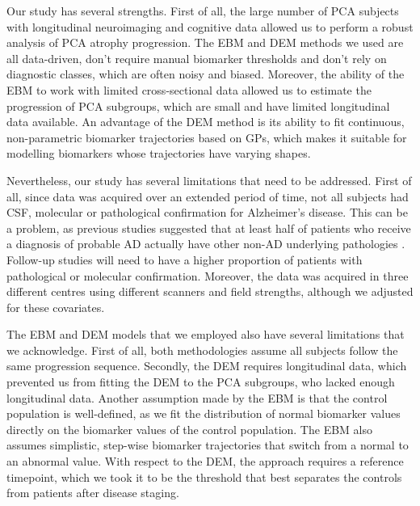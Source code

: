 Our study has several strengths. First of all, the large number of PCA subjects with longitudinal neuroimaging and cognitive data allowed us to perform a robust analysis of PCA atrophy progression. The EBM and DEM methods we used are all data-driven, don't require manual biomarker thresholds and don't rely on diagnostic classes, which are often noisy and biased. Moreover, the ability of the EBM to work with limited cross-sectional data allowed us to estimate the progression of PCA subgroups, which are small and have limited longitudinal data available.  An advantage of the DEM method is its ability to fit continuous, non-parametric biomarker trajectories based on GPs, which makes it suitable for modelling biomarkers whose trajectories have varying shapes.

Nevertheless, our study has several limitations that need to be addressed. First of all, since data was acquired over an extended period of time, not all subjects had CSF, molecular or pathological confirmation for Alzheimer's disease. This can be a problem, as previous studies suggested that at least half of patients who receive a  diagnosis of probable AD actually have other non-AD underlying pathologies \cite{schneider2007mixed,schneider2009neuropathology}. Follow-up studies will need to have a higher proportion of patients with pathological or molecular confirmation. Moreover, the data was acquired in three different centres using different scanners and field strengths, although we adjusted for these covariates. 

The EBM and DEM models that we employed also have several limitations that we acknowledge. First of all, both methodologies assume all subjects follow the same progression sequence. Secondly, the DEM requires longitudinal data, which prevented us from fitting the DEM to the PCA subgroups, who lacked enough longitudinal data. Another assumption made by the EBM is that the control population is well-defined, as we fit the distribution of normal biomarker values directly on the biomarker values of the control population. The EBM also assumes simplistic, step-wise biomarker trajectories that switch from a normal to an abnormal value. With respect to the DEM, the approach requires a reference timepoint, which we took it to be the threshold that best separates the controls from patients after disease staging.  

